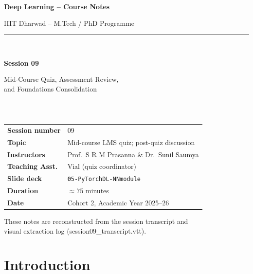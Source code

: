 \documentclass[12pt,a4paper]{article}
\begin{document}
\begin{titlepage}
  \centering
  \vspace*{2cm}
  {\LARGE\bfseries Deep Learning -- Course Notes\par}
  \vspace{0.5cm}
  {\large IIIT Dharwad -- M.Tech / PhD Programme\par}
  \vspace{1.5cm}
  \rule{\linewidth}{0.4pt}\\[0.4cm]
  {\Huge\bfseries Session 09\par}
  \vspace{0.3cm}
  {\Large Mid-Course Quiz, Assessment Review,\\[4pt]
          and Foundations Consolidation\par}
  \rule{\linewidth}{0.4pt}\\[1.5cm]
  \begin{tabular}{ll}
    \textbf{Session number} & 09 \\[4pt]
    \textbf{Topic}          & Mid-course LMS quiz; post-quiz discussion \\[4pt]
    \textbf{Instructors}    & Prof.\ S R M Prasanna \& Dr.\ Sunil Saumya \\[4pt]
    \textbf{Teaching Asst.} & Vial (quiz coordinator) \\[4pt]
    \textbf{Slide deck}     & \texttt{05-PyTorchDL-NNmodule} \\[4pt]
    \textbf{Duration}       & $\approx 75$ minutes \\[4pt]
    \textbf{Date}           & Cohort 2, Academic Year 2025--26 \\
  \end{tabular}
  \vfill
  {\small These notes are reconstructed from the session transcript and\\
  visual extraction log (session09\_transcript.vtt).}
\end{titlepage}


\newpage

\section{Introduction}
\label{sec:intro}
\end{document}
